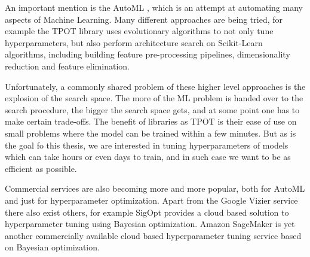 An important mention is the AutoML \citep{automl}, which is an attempt at automating many aspects of Machine Learning. Many different approaches are being tried, for example the TPOT \citep{tpot} library uses evolutionary algorithms to not only tune hyperparameters, but also perform architecture search on Scikit-Learn algorithms, including building feature pre-processing pipelines, dimensionality reduction and feature elimination.

Unfortunately, a commonly shared problem of these higher level approaches is the explosion of the search space. The more of the ML problem is handed over to the search procedure, the bigger the search space gets, and at some point one has to make certain trade-offs. The benefit of libraries as TPOT is their ease of use on small problems where the model can be trained within a few minutes. But as is the goal fo this thesis, we are interested in tuning hyperparameters of models which can take hours or even days to train, and in such case we want to be as efficient as possible.

Commercial services are also becoming more and more popular, both for AutoML and just for hyperparameter optimization. Apart from the Google Vizier service \citep{google-vizier} there also exist others, for example SigOpt \citep{sigopt} provides a cloud based solution to hyperparameter tuning using Bayesian optimization. Amazon SageMaker \citep{amazon-sagemaker} is yet another commercially available cloud based hyperparameter tuning service based on Bayesian optimization.



